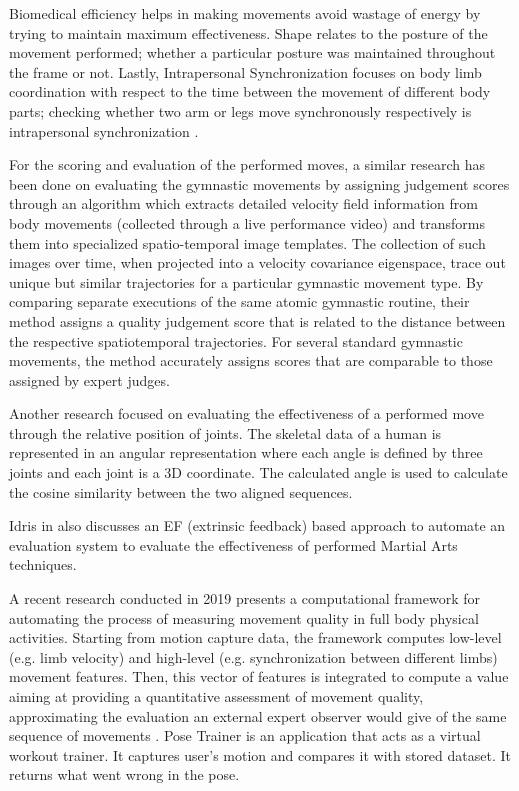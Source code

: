 Biomedical efficiency helps in making movements avoid wastage of energy by trying to maintain maximum effectiveness. Shape relates to the posture of the movement performed; whether a particular posture was maintained throughout the frame or not. Lastly, Intrapersonal Synchronization focuses on body limb coordination with respect to the time between the movement of different body parts; checking whether two arm or legs move synchronously respectively is intrapersonal synchronization \cite{movementQuality}. 


For the scoring and evaluation of the performed moves, a similar research has been done on evaluating the gymnastic movements by assigning judgement scores through an algorithm which extracts detailed velocity field information from body movements (collected through a live performance video) and transforms them into specialized spatio-temporal image templates. The collection of such images over time, when projected into a velocity covariance eigenspace, trace out unique but similar trajectories for a particular gymnastic movement type. By comparing separate executions of the same atomic gymnastic routine, their method assigns a quality judgement score that is related to the distance between the respective spatiotemporal trajectories. For several standard gymnastic movements, the method accurately assigns scores that are comparable to those assigned by expert judges. \cite{gymnastic}
 

Another research focused on evaluating the effectiveness of a performed move through the relative position of joints. The skeletal data of a human is represented in an angular representation where each angle is defined by three joints and each joint is a 3D coordinate. The calculated angle is used to calculate the cosine similarity between the two aligned sequences. \cite{Karate}


Idris in \cite{Idris} also discusses an EF (extrinsic feedback) based approach to automate an evaluation system to evaluate the effectiveness of performed Martial Arts techniques.
 

A recent research conducted in 2019 presents a computational framework for automating the process of measuring movement quality in full body physical activities. Starting from motion capture data, the framework computes low-level (e.g. limb velocity) and high-level (e.g. synchronization between different limbs) movement features. Then, this vector of features is integrated to compute a value aiming at providing a quantitative assessment of movement quality, approximating the evaluation an external expert observer would give of the same sequence of movements \cite{movementQuality}. Pose Trainer \cite{poseCorrect} is an application that acts as a virtual workout trainer. It captures user's motion and compares it with stored dataset. It returns what went wrong in the pose. 




